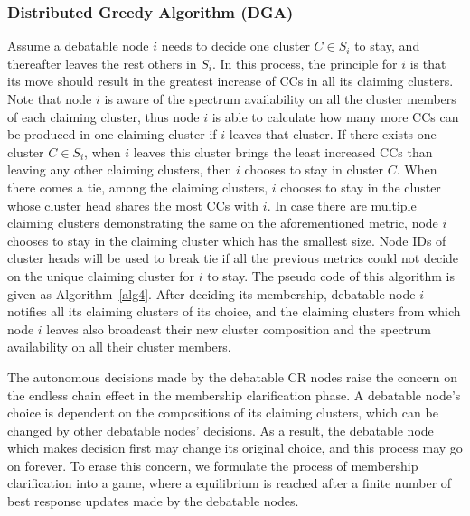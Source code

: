 \documentclass[10pt,journal,compsoc]{IEEEtran}
\theoremstyle{mytheoremstyle}
\theoremstyle{mytheoremstyle}
\theoremstyle{mytheoremstyle}
\newcommand{\ie}{i.e., }
\begin{document}
\subsubsection{Distributed Greedy Algorithm (DGA)}
Assume a debatable node $i$ needs to decide one cluster $C\in S_i$ to stay, and thereafter leaves the rest others in $S_i$.
In this process, the principle for $i$ is that its move should result in the greatest increase of CCs in all its claiming clusters.
Note that node $i$ is aware of the spectrum availability on all the cluster members of each claiming cluster, thus node $i$ is able to calculate how many more CCs can be produced in one claiming cluster if $i$ leaves that cluster.
If there exists one cluster $C\in S_i$, when $i$ leaves this cluster brings the least increased CCs than leaving any other claiming clusters, then $i$ chooses to stay in cluster $C$.
When there comes a tie, among the claiming clusters, $i$ chooses to stay in the cluster whose cluster head shares the most CCs with $i$.
In case there are multiple claiming clusters demonstrating the same on the aforementioned metric, node $i$ chooses to stay in the claiming cluster which has the smallest size.
Node IDs of cluster heads will be used to break tie if all the previous metrics could not decide on the unique claiming cluster for $i$ to stay.
The pseudo code of this algorithm is given as Algorithm~\ref{alg4}.
After deciding its membership, debatable node $i$ notifies all its claiming clusters of its choice, and the claiming clusters from which node $i$ leaves also broadcast their new cluster composition and the spectrum availability on all their cluster members.

The autonomous decisions made by the debatable CR nodes raise the concern on the endless chain effect in the membership clarification phase.
A debatable node's choice is dependent on the compositions of its claiming clusters, which can be changed by other debatable nodes' decisions.
As a result, the debatable node which makes decision first may change its original choice, and this process may go on forever.
To erase this concern, we formulate the process of membership clarification into a game, where a equilibrium is reached after a finite number of best response updates made by the debatable nodes.
\end{document}
